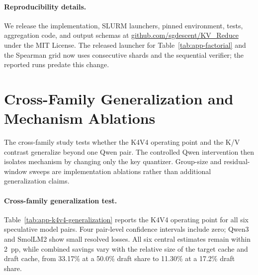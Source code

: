 \documentclass{article}
\begin{document}
\paragraph{Reproducibility details.}
We release the
implementation, SLURM launchers, pinned environment, tests, aggregation
code, and output schemas at \href{https://github.com/sgdescent/KV_Reduce}{github.com/sgdescent/KV\_Reduce} under the MIT License.
The released launcher for Table~\ref{tab:app-factorial} and the Spearman grid
now uses consecutive shards and the sequential verifier; the reported runs
predate this change.

\section{Cross-Family Generalization and Mechanism Ablations}
\label{app:geometry}

The cross-family study tests
whether the K4V4 operating point and the K/V contrast generalize beyond one
Qwen pair. The controlled Qwen intervention then isolates mechanism by changing
only the key quantizer. Group-size and residual-window sweeps are implementation
ablations rather than additional generalization claims.

\paragraph{Cross-family generalization test.}
Table~\ref{tab:app-k4v4-generalization} reports the K4V4 operating point for
all six speculative model pairs. Four pair-level confidence intervals include zero;
Qwen3 and SmolLM2 show small resolved losses. All six central estimates remain
within 2~pp, while combined savings vary with the relative
size of the target cache and draft cache, from 33.17\% at a 50.0\%
draft share to 11.30\% at a 17.2\% draft share.
\end{document}
